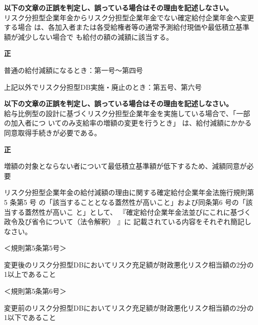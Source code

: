 \begin{truefalse}[年金1 \ 2018 \ 問題2(1)\textcircled{1}]

\textbf{以下の文章の正誤を判定し、誤っている場合はその理由を記述しなさい。}
\\

  リスク分担型企業年金からリスク分担型企業年金でない確定給付企業年金へ変更する場合
は、各加入者または各受給権者等の通常予測給付現価や最低積立基準額が減少しない場合で
も給付の額の減額に該当する。
\end{truefalse}

\begin{answerbox}
  \textbf{正}
\end{answerbox}

\begin{explanationbox}
  普通の給付減額になるとき：第一号〜第四号

  上記以外でリスク分担型DB実施・廃止のとき：第五号、第六号
\end{explanationbox}

\begin{truefalse}[年金1 \ H29 \ 問題2(1)]
\textbf{以下の文章の正誤を判定し、誤っている場合はその理由を記述しなさい。}
\\

  給与比例型の設計に基づくリスク分担型企業年金を実施している場合で、「一部の加入者につ
いてのみ支給率の増額の変更を行うとき」 は、給付減額にかかる同意取得手続きが必要である。
\end{truefalse}

\begin{answerbox}
  \textbf{正}
\end{answerbox}

\begin{explanationbox}
  増額の対象とならない者について最低積立基準額が低下するため、減額同意が必要
\end{explanationbox}

\begin{shortanswer}[年金1 \ 2020 \ 問題2(1)\textcircled{3}]
  リスク分担型企業年金の給付減額の理由に関する確定給付企業年金法施行規則第 5 条第5 号
の「該当することとなる蓋然性が高いこと」および同条第6 号の「該当する蓋然性が高いこ
と」として、 『確定給付企業年金法並びにこれに基づく政令及び省令について（法令解釈） 』に
記載されている内容をそれぞれ簡記しなさい。
\end{shortanswer}

\begin{answerbox}
＜規則第5条第5号＞

変更後のリスク分担型DBにおいてリスク充足額が財政悪化リスク相当額の2分の1以上であること

＜規則第5条第6号＞

変更前のリスク分担型DBにおいてリスク充足額が財政悪化リスク相当額の2分の1以下であること
\end{answerbox}


